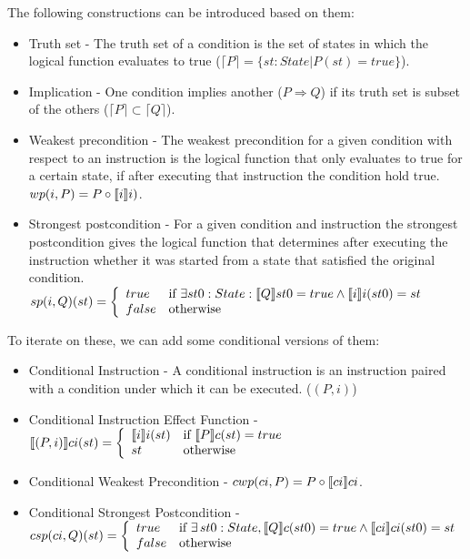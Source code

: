 The following constructions can be introduced based on them:
\begin{itemize}
    \item Truth set - The truth set of a condition is the set of states in which the logical function evaluates to true ($\lceil P \rceil = \{st : State | P(st) = true\}$).
    \item Implication - One condition implies another ($P \Rightarrow Q$) if its truth set is subset of the others ($\lceil P \rceil \subset \lceil Q \rceil$).
    \item Weakest precondition - The weakest precondition for a given condition with respect to an instruction is the logical function that only evaluates to true for a certain state, if after executing that instruction the condition hold true. $wp(i , P) = P \circ \llbracket i \rrbracket i)$.
    \item Strongest postcondition - For a given condition and instruction the strongest postcondition gives the logical function that determines after executing the instruction whether it was started from a state that satisfied the original condition.
    $
    sp(i, Q)(st) =
        \left\{
        	\begin{array}{ll}
        		true & \mbox{if } \exists st0 : State : \llbracket Q \rrbracket st0 = true \land \llbracket i \rrbracket i(st0) = st \\
        		false & \mbox{otherwise}
        	\end{array}
        \right.
    $
    
\end{itemize}

To iterate on these, we can add some conditional versions of them:

\begin{itemize}
    \item Conditional Instruction - A conditional instruction is an instruction paired with a condition under which it can be executed. ($(P, i)$)
    \item Conditional Instruction Effect Function - 
    $
    \llbracket (P, i) \rrbracket ci(st) = 
    \left\{
        	\begin{array}{ll}
        		\llbracket i \rrbracket i(st) & \mbox{if } \llbracket P \rrbracket c(st) = true \\
        		st & \mbox{otherwise}
        	\end{array}
        \right.
    $
    
    \item Conditional Weakest Precondition - $cwp(ci , P) = P \circ \llbracket ci \rrbracket ci$.
    \item Conditional Strongest Postcondition - \\
    $
    csp(ci, Q)(st) =
        \left\{
        	\begin{array}{ll}
        		true & \mbox{if } \exists \, st0 : State , \llbracket Q \rrbracket c(st0) = true \land \llbracket ci \rrbracket ci(st0) = st \\
        		false & \mbox{otherwise}
        	\end{array}
        \right.
    $
\end{itemize}

